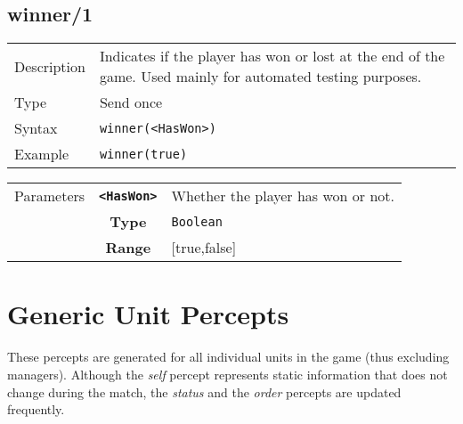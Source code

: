 \subsection{winner/1}
\begin{tabularx}{\textwidth}{lX}
 Description & Indicates if the player has won or lost at the end of the game. Used mainly for automated testing purposes. \\
 Type & Send once \\
 Syntax &  \verb|winner(<HasWon>)| \\
 Example & \verb|winner(true)|   \\
 \end{tabularx}
 \begin{tabularx}{\textwidth}{l | c | p{8cm}|}
 \cline{2-3}
  Parameters & \textbf{\verb|<HasWon>|} & Whether the player has won or not. \\
             & \textbf{Type} & \verb|Boolean| \\
            & \textbf{Range} & [true,false] \\
            \cline{2-3}
 \end{tabularx}
 
\newpage
 
\section{Generic Unit Percepts}
These percepts are generated for all individual units in the game (thus excluding managers). Although the \textit{self} percept represents static information that does not change during the match, the \textit{status} and the \textit{order} percepts are updated frequently.

